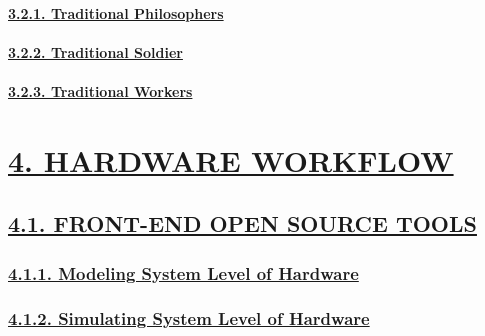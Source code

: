 \documentclass[
]{article}
\begin{document}
\hypertarget{traditional-philosophers}{%
\paragraph{\texorpdfstring{\protect\hyperlink{traditional-philosophers-1}{3.2.1.
Traditional
Philosophers}}{3.2.1. Traditional Philosophers}}\label{traditional-philosophers}}

\hypertarget{traditional-soldier}{%
\paragraph{\texorpdfstring{\protect\hyperlink{traditional-soldier-1}{3.2.2.
Traditional
Soldier}}{3.2.2. Traditional Soldier}}\label{traditional-soldier}}

\hypertarget{traditional-workers}{%
\paragraph{\texorpdfstring{\protect\hyperlink{traditional-workers-1}{3.2.3.
Traditional
Workers}}{3.2.3. Traditional Workers}}\label{traditional-workers}}

\hypertarget{hardware-workflow}{%
\section{\texorpdfstring{\protect\hyperlink{hardware-workflow-1}{4.
HARDWARE WORKFLOW}}{4. HARDWARE WORKFLOW}}\label{hardware-workflow}}

\hypertarget{front-end-open-source-tools}{%
\subsection{\texorpdfstring{\protect\hyperlink{front-end-open-source-tools-2}{4.1.
FRONT-END OPEN SOURCE
TOOLS}}{4.1. FRONT-END OPEN SOURCE TOOLS}}\label{front-end-open-source-tools}}

\hypertarget{modeling-system-level-of-hardware}{%
\subsubsection{\texorpdfstring{\protect\hyperlink{modeling-system-level-of-hardware-1}{4.1.1.
Modeling System Level of
Hardware}}{4.1.1. Modeling System Level of Hardware}}\label{modeling-system-level-of-hardware}}

\hypertarget{simulating-system-level-of-hardware}{%
\subsubsection{\texorpdfstring{\protect\hyperlink{simulating-system-level-of-hardware-1}{4.1.2.
Simulating System Level of
Hardware}}{4.1.2. Simulating System Level of Hardware}}\label{simulating-system-level-of-hardware}}
\end{document}
